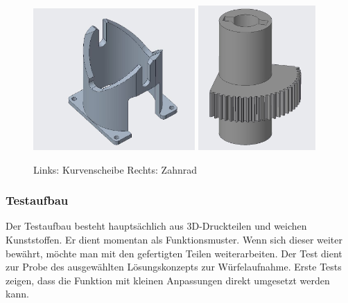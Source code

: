 \documentclass[../../main.tex]{subfiles}
\begin{document}
        \begin{figure}[H]
            \centering
            \includegraphics[width=0.55\textwidth]{../../images/Kran/Kurvenscheibe.JPG}
            \includegraphics[width=0.4\textwidth]{../../images/Kran/Zahnrad.JPG}
            \caption {Links: Kurvenscheibe  Rechts: Zahnrad}
        \end{figure}
        \pagebreak


        \subsubsection{Testaufbau}
        Der Testaufbau besteht hauptsächlich aus 3D-Druckteilen und weichen Kunststoffen. Er dient momentan als Funktionsmuster. Wenn sich dieser weiter bewährt, möchte man mit den gefertigten Teilen weiterarbeiten. Der Test dient zur Probe des ausgewählten Lösungskonzepts zur Würfelaufnahme. Erste Tests zeigen, dass die Funktion mit kleinen Anpassungen direkt umgesetzt werden kann.
\end{document}
